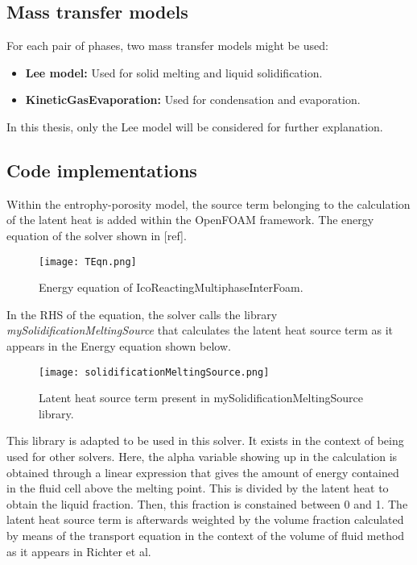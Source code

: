 \subsection{Mass transfer models}
For each pair of phases, two mass transfer models might be used:
\begin{itemize}
	\item \textbf{Lee model:} Used for solid melting and liquid solidification.
	\item \textbf{KineticGasEvaporation:} Used for condensation and evaporation.
\end{itemize}
In this thesis, only the Lee model will be considered for further explanation.








\subsection{Code implementations}
Within the entrophy-porosity model, the source term belonging to the calculation of the latent heat is added within the OpenFOAM framework. The energy equation of the solver shown in [ref].
\begin{figure}[h!]
	\texttt{[image: TEqn.png]}\hfill	
	\caption{Energy equation of IcoReactingMultiphaseInterFoam.}\label{}
\end{figure}
In the RHS of the equation, the solver calls the library \textit{mySolidificationMeltingSource} that calculates the latent heat source term as it appears in the Energy equation shown below.
\begin{figure}[h!]
	\texttt{[image: solidificationMeltingSource.png]}\hfill	
	\caption{Latent heat source term present in mySolidificationMeltingSource library.}\label{}
\end{figure}
This library is adapted to be used in this solver. It exists in the context of being used for other solvers. Here, the alpha variable showing up in the calculation is obtained through a linear expression that gives the amount of energy contained in the fluid cell above the melting point. This is divided by the latent heat to obtain the liquid fraction. Then, this fraction is constained between 0 and 1. 
\newline
The latent heat source term is afterwards weighted by the volume fraction calculated by means of the transport equation in the context of the volume of fluid method as it appears in Richter et al. 
\newline

